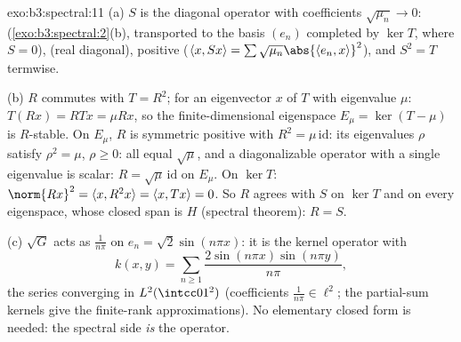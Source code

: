 \begin{solution}{exo:b3:spectral:11}
(a) $S$ is the diagonal operator with coefficients
$\sqrt{\mu_n} \to 0$: 
(\cref{exo:b3:spectral:2}(b), transported to the basis
$(e_n)$ completed by $\ker T$, where $S = 0$), 
(real diagonal), positive ($\langle x, Sx\rangle =
\sum\sqrt{\mu_n}\abs{\langle e_n, x\rangle}^2$), and $S^2 =
T$ termwise.

(b) $R$ commutes with $T = R^2$; for an eigenvector $x$ of
$T$ with eigenvalue $\mu$: $T(Rx) = RTx = \mu Rx$, so the
finite-dimensional eigenspace $E_\mu = \ker(T - \mu)$ is
$R$-stable. On $E_\mu$, $R$ is symmetric positive with $R^2
= \mu\,\mathrm{id}$: its eigenvalues $\rho$ satisfy $\rho^2
= \mu$, $\rho \geq 0$: all equal $\sqrt\mu$, and a
diagonalizable operator with a single eigenvalue is scalar:
$R = \sqrt\mu\,\mathrm{id}$ on $E_\mu$. On $\ker T$: $\norm
{Rx}^2 = \langle x, R^2x\rangle = \langle x, Tx\rangle = 0$.
So $R$ agrees with $S$ on $\ker T$ and on every eigenspace,
whose closed span is $H$ (spectral theorem): $R = S$.

(c) $\sqrt G$ acts as $\frac1{n\pi}$ on $e_n =
\sqrt2\sin(n\pi x)$: it is the kernel operator with
\[
k(x, y) = \sum_{n\geq1}\frac{2\sin(n\pi x)\sin(n\pi
y)}{n\pi},
\]
the series converging in $L^2(\intcc01^2)$ (coefficients
$\frac1{n\pi} \in \ell^2$; the partial-sum kernels give the
finite-rank approximations). No elementary closed form is
needed: the spectral side \emph{is} the operator.
\end{solution}


